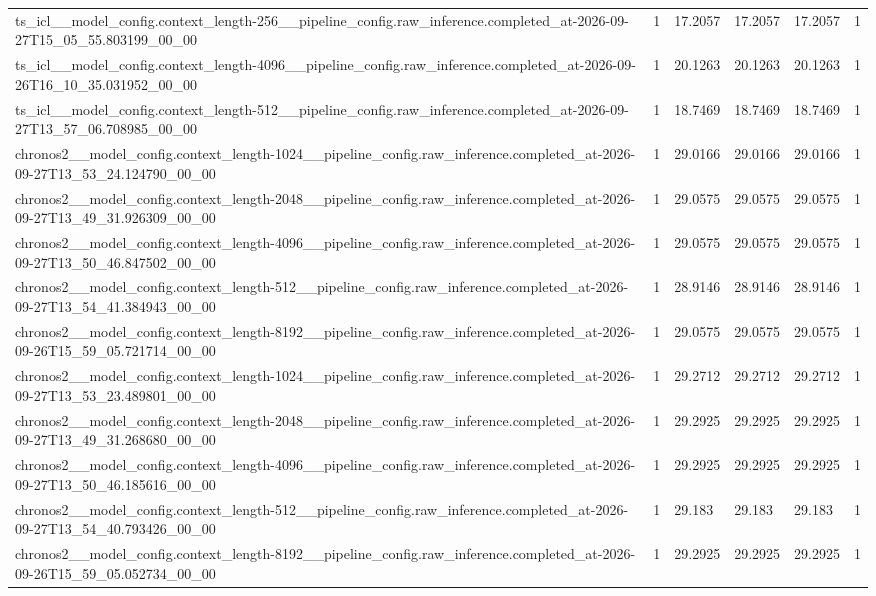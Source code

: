 \begin{tabular}{llllll}
ts\_icl\_\_model\_config.context\_length-256\_\_pipeline\_config.raw\_inference.completed\_at-2026-09-27T15\_05\_55.803199\_00\_00 & 1 & 17.2057 & 17.2057 & 17.2057 & 1 \\
ts\_icl\_\_model\_config.context\_length-4096\_\_pipeline\_config.raw\_inference.completed\_at-2026-09-26T16\_10\_35.031952\_00\_00 & 1 & 20.1263 & 20.1263 & 20.1263 & 1 \\
ts\_icl\_\_model\_config.context\_length-512\_\_pipeline\_config.raw\_inference.completed\_at-2026-09-27T13\_57\_06.708985\_00\_00 & 1 & 18.7469 & 18.7469 & 18.7469 & 1 \\
chronos2\_\_model\_config.context\_length-1024\_\_pipeline\_config.raw\_inference.completed\_at-2026-09-27T13\_53\_24.124790\_00\_00 & 1 & 29.0166 & 29.0166 & 29.0166 & 1 \\
chronos2\_\_model\_config.context\_length-2048\_\_pipeline\_config.raw\_inference.completed\_at-2026-09-27T13\_49\_31.926309\_00\_00 & 1 & 29.0575 & 29.0575 & 29.0575 & 1 \\
chronos2\_\_model\_config.context\_length-4096\_\_pipeline\_config.raw\_inference.completed\_at-2026-09-27T13\_50\_46.847502\_00\_00 & 1 & 29.0575 & 29.0575 & 29.0575 & 1 \\
chronos2\_\_model\_config.context\_length-512\_\_pipeline\_config.raw\_inference.completed\_at-2026-09-27T13\_54\_41.384943\_00\_00 & 1 & 28.9146 & 28.9146 & 28.9146 & 1 \\
chronos2\_\_model\_config.context\_length-8192\_\_pipeline\_config.raw\_inference.completed\_at-2026-09-26T15\_59\_05.721714\_00\_00 & 1 & 29.0575 & 29.0575 & 29.0575 & 1 \\
chronos2\_\_model\_config.context\_length-1024\_\_pipeline\_config.raw\_inference.completed\_at-2026-09-27T13\_53\_23.489801\_00\_00 & 1 & 29.2712 & 29.2712 & 29.2712 & 1 \\
chronos2\_\_model\_config.context\_length-2048\_\_pipeline\_config.raw\_inference.completed\_at-2026-09-27T13\_49\_31.268680\_00\_00 & 1 & 29.2925 & 29.2925 & 29.2925 & 1 \\
chronos2\_\_model\_config.context\_length-4096\_\_pipeline\_config.raw\_inference.completed\_at-2026-09-27T13\_50\_46.185616\_00\_00 & 1 & 29.2925 & 29.2925 & 29.2925 & 1 \\
chronos2\_\_model\_config.context\_length-512\_\_pipeline\_config.raw\_inference.completed\_at-2026-09-27T13\_54\_40.793426\_00\_00 & 1 & 29.183 & 29.183 & 29.183 & 1 \\
chronos2\_\_model\_config.context\_length-8192\_\_pipeline\_config.raw\_inference.completed\_at-2026-09-26T15\_59\_05.052734\_00\_00 & 1 & 29.2925 & 29.2925 & 29.2925 & 1 \\

\end{tabular}
